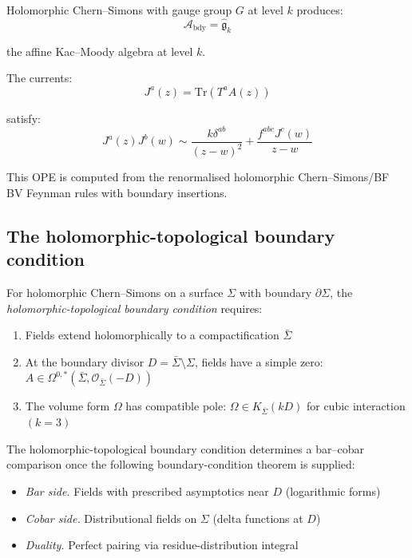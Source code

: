 \begin{example}
Holomorphic Chern--Simons with gauge group $G$ at level $k$ produces:
\[\mathcal{A}_{\text{bdy}} = \widehat{\mathfrak{g}}_k\]

the affine Kac--Moody algebra at level $k$.

The currents:
\[J^a(z) = \text{Tr}(T^a A(z))\]

satisfy:
\[J^a(z) J^b(w) \sim \frac{k \delta^{ab}}{(z-w)^2} +
\frac{f^{abc} J^c(w)}{z-w}\]

This OPE is computed from the renormalised holomorphic
Chern--Simons/BF BV Feynman rules with boundary insertions.
\end{example}

\subsection{The holomorphic-topological boundary condition}

\begin{definition}
For holomorphic Chern--Simons on a surface $\Sigma$ with boundary $\partial \Sigma$,
the \emph{holomorphic-topological boundary condition} requires:
\begin{enumerate}
\item Fields extend holomorphically to a compactification $\bar{\Sigma}$
\item At the boundary divisor $D = \bar{\Sigma} \setminus \Sigma$, fields have
a simple zero: $A \in \Omega^{0,*}(\bar{\Sigma}, \mathcal{O}_{\bar{\Sigma}}(-D))$
\item The volume form $\Omega$ has compatible pole: $\Omega \in K_{\bar{\Sigma}}(kD)$
for cubic interaction $(k=3)$
\end{enumerate}
\end{definition}

\begin{remark}
The holomorphic-topological boundary condition determines a bar--cobar
comparison once the following boundary-condition theorem is supplied:
\begin{itemize}
\item \emph{Bar side.} Fields with prescribed asymptotics near $D$ (logarithmic
forms)
\item \emph{Cobar side.} Distributional fields on $\Sigma$ (delta functions at $D$)
\item \emph{Duality.} Perfect pairing via residue-distribution integral
\end{itemize}
\end{remark}

